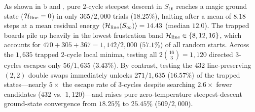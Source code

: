As shown in b and , pure $2$-cycle steepest descent in $S_{16}$ reaches a magic ground state ($\mathcal{H}_{\mathrm{line}} = 0$) in only $365 / 2{,}000$ trials ($18.25\%$), halting after a mean of $8.18$ steps at a mean residual energy $\langle\mathcal{H}_{\mathrm{line}}(S_\infty)\rangle = 14.43$ (median $12.0$). The trapped boards pile up heavily in the lowest frustration band $\mathcal{H}_{\mathrm{line}} \in \{8, 12, 16\}$, which accounts for $470 + 305 + 367 = 1{,}142 / 2{,}000$ ($57.1\%$) of all random starts. Across the $1{,}635$ trapped $2$-cycle local minima, testing all $2\binom{16}{3} = 1{,}120$ directed $3$-cycles escapes only $56 / 1{,}635$ ($3.43\%$). By contrast, testing the $432$ line-preserving $(2,2)$ double swaps immediately unlocks $271 / 1{,}635$ ($16.57\%$) of the trapped states---nearly $5\times$ the escape rate of $3$-cycles despite searching $2.6\times$ fewer candidates ($432$ vs.\ $1{,}120$)---and raises pure zero-temperature steepest-descent ground-state convergence from $18.25\%$ to $25.45\%$ ($509 / 2{,}000$).

